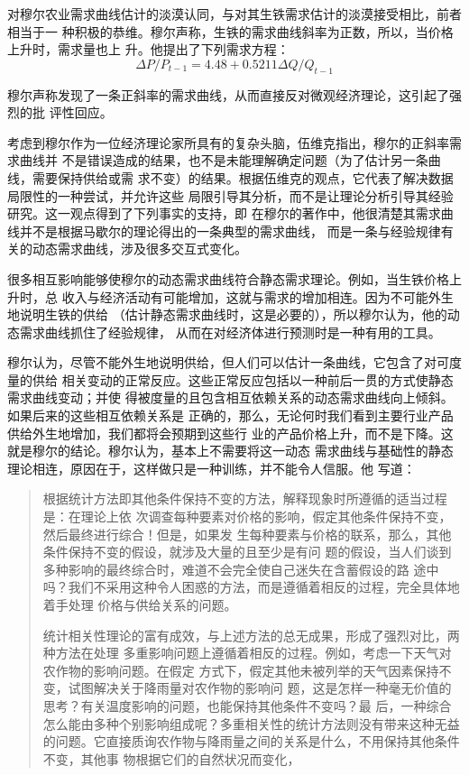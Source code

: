 对穆尔农业需求曲线估计的淡漠认同，与对其生铁需求估计的淡漠接受相比，前者相当于一
种积极的恭维。穆尔声称，生铁的需求曲线斜率为正数，所以，当价格上升时，需求量也上
升。他提出了下列需求方程：
\[\Delta P/P_{t-1}=4.48+0.5211 \Delta Q/Q_{t-1}\]

穆尔声称发现了一条正斜率的需求曲线，从而直接反对微观经济理论，这引起了强烈的批
评性回应。

考虑到穆尔作为一位经济理论家所具有的复杂头脑，伍维克指出，穆尔的正斜率需求曲线并
不是错误造成的结果，也不是未能理解确定问题（为了估计另一条曲线，需要保持供给或需
求不变）的结果。根据伍维克的观点，它代表了解决数据局限性的一种尝试，并允许这些
局限引导其分析，而不是让理论分析引导其经验研究。这一观点得到了下列事实的支持，即
在穆尔的著作中，他很清楚其需求曲线并不是根据马歇尔的理论得出的一条典型的需求曲线，
而是一条与经验规律有关的动态需求曲线，涉及很多交互式变化。

很多相互影响能够使穆尔的动态需求曲线符合静态需求理论。例如，当生铁价格上升时，总
收入与经济活动有可能增加，这就与需求的增加相连。因为不可能外生地说明生铁的供给
（估计静态需求曲线时，这是必要的），所以穆尔认为，他的动态需求曲线抓住了经验规律，
从而在对经济体进行预测时是一种有用的工具。

穆尔认为，尽管不能外生地说明供给，但人们可以估计一条曲线，它包含了对可度量的供给
相关变动的正常反应。这些正常反应包括以一种前后一贯的方式使静态需求曲线变动；并使
得被度量的且包含相互依赖关系的动态需求曲线向上倾斜。如果后来的这些相互依赖关系是
正确的，那么，无论何时我们看到主要行业产品供给外生地增加，我们都将会预期到这些行
业的产品价格上升，而不是下降。这就是穆尔的结论。穆尔认为，基本上不需要将这一动态
需求曲线与基础性的静态理论相连，原因在于，这样做只是一种训练，并不能令人信服。他
写道：

\begin{quotation}
  根据统计方法即其他条件保持不变的方法，解释现象时所遵循的适当过程是：在理论上依
  次调查每种要素对价格的影响，假定其他条件保持不变，然后最终进行综合！但是，如果发
  生每种要素与价格的联系，那么，其他条件保持不变的假设，就涉及大量的且至少是有问
  题的假设，当人们谈到多种影响的最终综合时，难道不会完全使自己迷失在含蓄假设的路
  途中吗？我们不采用这种令人困惑的方法，而是遵循着相反的过程，完全具体地着手处理
  价格与供给关系的问题。

  统计相关性理论的富有成效，与上述方法的总无成果，形成了强烈对比，两种方法在处理
  多重影响问题上遵循着相反的过程。例如，考虑一下天气对农作物的影响问题。在假定
  方式下，假定其他未被列举的天气因素保持不变，试图解决关于降雨量对农作物的影响问
  题，这是怎样一种毫无价值的思考？有关温度影响的问题，也能保持其他条件不变吗？最
  后，一种综合怎么能由多种个别影响组成呢？多重相关性的统计方法则没有带来这种无益
  的问题。它直接质询农作物与降雨量之间的关系是什么，不用保持其他条件不变，其他事
  物根据它们的自然状况而变化，
\end{quotation}


